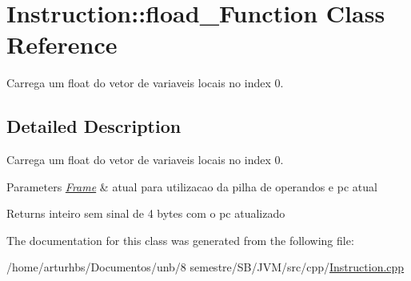 \hypertarget{classInstruction_1_1fload__0Function}{}\section{Instruction\+:\+:fload\+\_\+Function Class Reference}
\label{classInstruction_1_1fload__0Function}


Carrega um float do vetor de variaveis locais no index 0.  




\subsection{Detailed Description}
Carrega um float do vetor de variaveis locais no index 0. 


\begin{DoxyParams}{Parameters}
{\em \hyperlink{classFrame}{Frame}} & atual para utilizacao da pilha de operandos e pc atual \\
\hline
\end{DoxyParams}
\begin{DoxyReturn}{Returns}
inteiro sem sinal de 4 bytes com o pc atualizado 
\end{DoxyReturn}


The documentation for this class was generated from the following file\+:\begin{DoxyCompactItemize}
\item 
/home/arturhbs/\+Documentos/unb/8 semestre/\+S\+B/\+J\+V\+M/src/cpp/\hyperlink{Instruction_8cpp}{Instruction.\+cpp}\end{DoxyCompactItemize}
